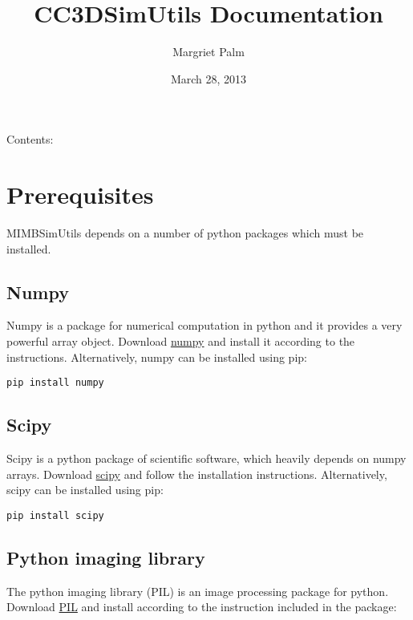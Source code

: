 \documentclass[letterpaper,10pt,english]{sphinxmanual}
\title{CC3DSimUtils Documentation}
\date{March 28, 2013}
\author{Margriet Palm}
\begin{document}
\maketitle
\tableofcontents
{}\label{CC3DSimUtils::doc}


Contents:


\chapter{Prerequisites}
\label{Preq:prerequisites}\label{Preq::doc}\label{Preq:welcome-to-cc3dsimutils-documentation}
MIMBSimUtils depends on a number of python packages which must be installed.


\section{Numpy}
\label{Preq:numpy}
Numpy is a package for numerical computation in python and it provides a very powerful array object. Download \href{http://sourceforge.net/projects/numpy/files/}{numpy} and install it according to the instructions. Alternatively, numpy can be installed using pip:

\begin{Verbatim}[commandchars=\\\{\}]
pip install numpy
\end{Verbatim}


\section{Scipy}
\label{Preq:scipy}
Scipy is a python package of scientific software, which heavily depends on numpy arrays. Download \href{http://sourceforge.net/projects/scipy/files/}{scipy} and follow the installation instructions. Alternatively, scipy can be installed using pip:

\begin{Verbatim}[commandchars=\\\{\}]
pip install scipy
\end{Verbatim}


\section{Python imaging library}
\label{Preq:python-imaging-library}
The python imaging library (PIL) is an image processing package for python. Download \href{http://www.pythonware.com/products/pil/\#pil117}{PIL} and install according to the instruction included in the package:
\end{document}

